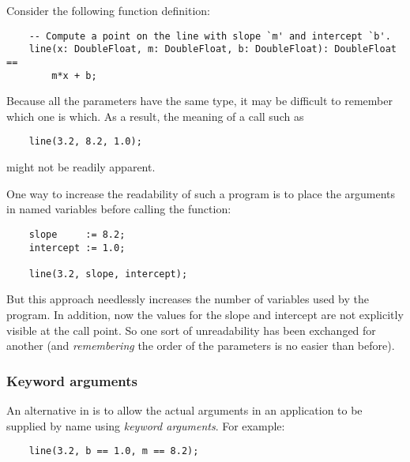 Consider the following function definition:

\begin{small}
\begin{verbatim}
    -- Compute a point on the line with slope `m' and intercept `b'.
    line(x: DoubleFloat, m: DoubleFloat, b: DoubleFloat): DoubleFloat ==
        m*x + b;
\end{verbatim}
\end{small}

Because all the parameters have the same type, it may be difficult
to remember which one is which.  As a result, the meaning of a call such as

\begin{small}
\begin{verbatim}
    line(3.2, 8.2, 1.0);
\end{verbatim}
\end{small}

might not be readily apparent.

One way to increase the readability of such a program is to place
the arguments in named variables before calling the function:

\begin{small}
\begin{verbatim}
    slope     := 8.2;
    intercept := 1.0;

    line(3.2, slope, intercept);
\end{verbatim}
\end{small}

But this approach needlessly increases the number of variables
used by the program.  In addition, now the values for the slope
and intercept are not explicitly visible at the call point.
So one sort of unreadability has been exchanged for another 
(and {\em remembering} the order of the parameters is no easier
than before).

\subsubsection{Keyword arguments}

An alternative in \asharp{} is to allow the actual arguments
in an application to be supplied by name using {\em keyword arguments\/}.
For example:

\begin{small}
\begin{verbatim}
    line(3.2, b == 1.0, m == 8.2);
\end{verbatim}
\end{small}

